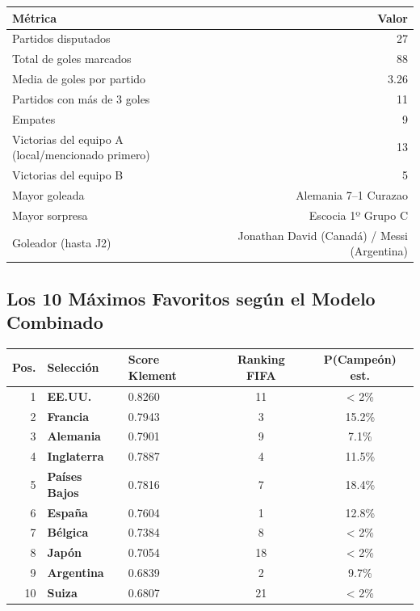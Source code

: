 \documentclass[11pt,a4paper]{article}
\begin{document}
\begin{center}
\begin{tabular}{@{}lr@{}}
\toprule
\textbf{Métrica} & \textbf{Valor} \\
\midrule
\rowcolor{tablerow}
Partidos disputados & 27 \\
Total de goles marcados & 88 \\
\rowcolor{tablerow}
Media de goles por partido & 3.26 \\
Partidos con más de 3 goles & 11 \\
\rowcolor{tablerow}
Empates & 9 \\
Victorias del equipo A (local/mencionado primero) & 13 \\
\rowcolor{tablerow}
Victorias del equipo B & 5 \\
Mayor goleada & Alemania 7--1 Curazao \\
\rowcolor{tablerow}
Mayor sorpresa & Escocia 1º Grupo C \\
Goleador (hasta J2) & Jonathan David (Canadá) / Messi (Argentina) \\
\bottomrule
\end{tabular}
\end{center}

\vspace{0.5cm}

\subsection{Los 10 Máximos Favoritos según el Modelo Combinado}

\begin{center}
\begin{tabular}{@{}rllcc@{}}
\toprule
\textbf{Pos.} & \textbf{Selección} & \textbf{Score Klement} & \textbf{Ranking FIFA} & \textbf{P(Campeón) est.} \\
\midrule
  1 & \textbf{EE.UU.} & 0.8260 & 11 & < 2\% \\
  \rowcolor{tablerow}2 & \textbf{Francia} & 0.7943 & 3 & 15.2\% \\
  3 & \textbf{Alemania} & 0.7901 & 9 & 7.1\% \\
  \rowcolor{tablerow}4 & \textbf{Inglaterra} & 0.7887 & 4 & 11.5\% \\
  5 & \textbf{Países Bajos} & 0.7816 & 7 & 18.4\% \\
  \rowcolor{tablerow}6 & \textbf{España} & 0.7604 & 1 & 12.8\% \\
  7 & \textbf{Bélgica} & 0.7384 & 8 & < 2\% \\
  \rowcolor{tablerow}8 & \textbf{Japón} & 0.7054 & 18 & < 2\% \\
  9 & \textbf{Argentina} & 0.6839 & 2 & 9.7\% \\
  \rowcolor{tablerow}10 & \textbf{Suiza} & 0.6807 & 21 & < 2\% \\

\bottomrule
\end{tabular}
\end{center}
\end{document}
